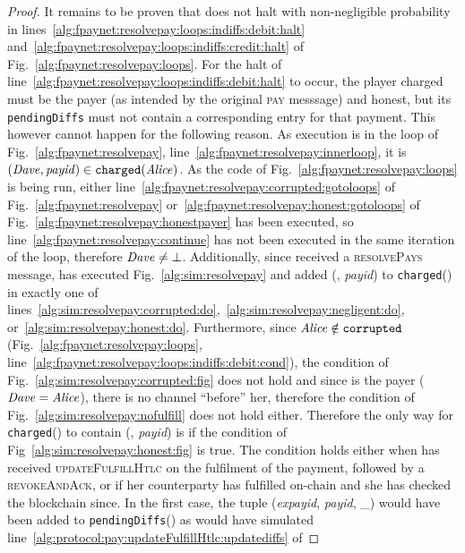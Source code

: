 \begin{proof}
  It remains to be proven that \fpaynet{} does not halt with non-negligible
  probability in lines~\ref{alg:fpaynet:resolvepay:loops:indiffs:debit:halt}
  and~\ref{alg:fpaynet:resolvepay:loops:indiffs:credit:halt} of
  Fig.~\ref{alg:fpaynet:resolvepay:loops}. For the halt of
  line~\ref{alg:fpaynet:resolvepay:loops:indiffs:debit:halt} to occur, the
  player charged must be the payer (as intended by the original \textsc{pay}
  messsage) and honest, but its \texttt{pendingDiffs} must not contain a
  corresponding entry for that payment. This however cannot happen for the
  following reason. As execution is in the loop of
  Fig.~\ref{alg:fpaynet:resolvepay},
  line~\ref{alg:fpaynet:resolvepay:innerloop}, it is $(\mathit{Dave}, \mathit{payid})
  \in \mathtt{charged}(\mathit{Alice})$. As the code of
  Fig.~\ref{alg:fpaynet:resolvepay:loops} is being run, either
  line~\ref{alg:fpaynet:resolvepay:corrupted:gotoloops} of
  Fig.~\ref{alg:fpaynet:resolvepay}
  or~\ref{alg:fpaynet:resolvepay:honest:gotoloops} of
  Fig.~\ref{alg:fpaynet:resolvepay:honestpayer} has been executed, so
  line~\ref{alg:fpaynet:resolvepay:continue} has not been executed in the same
  iteration of the loop, therefore $\mathit{Dave} \neq \bot$. Additionally, since
  \fpaynet{} received a \textsc{resolvePays} message, \simulator{} has executed
  Fig.~\ref{alg:sim:resolvepay} and added (\dave, \textit{payid}) to
  \texttt{charged}(\alice) in exactly one of
  lines~\ref{alg:sim:resolvepay:corrupted:do},~\ref{alg:sim:resolvepay:negligent:do},
  or~\ref{alg:sim:resolvepay:honest:do}. Furthermore, since $\mathit{Alice} \notin
  \mathtt{corrupted}$ (Fig.~\ref{alg:fpaynet:resolvepay:loops},
  line~\ref{alg:fpaynet:resolvepay:loops:indiffs:debit:cond}), the condition of
  Fig.~\ref{alg:sim:resolvepay:corrupted:fig} does not hold and since \alice{}
  is the payer ($\mathit{Dave}{} = \mathit{Alice}$), there is no channel ``before'' her,
  therefore the condition of Fig.~\ref{alg:sim:resolvepay:nofulfill} does not
  hold either. Therefore the only way for \texttt{charged}(\alice) to contain
  (\alice, \textit{payid}) is if the condition of
  Fig~\ref{alg:sim:resolvepay:honest:fig} is true. The condition holds either
  when \alice{} has received \textsc{updateFulfillHtlc} on the fulfilment of the
  payment, followed by a \textsc{revokeAndAck}, or if her counterparty has
  fulfilled on-chain and she has checked the blockchain since. In the first
  case, the tuple (\textit{expayid}, \textit{payid}, \_) would have been added
  to \texttt{pendingDiffs}(\alice) as \simulator{} would have simulated
  line~\ref{alg:protocol:pay:updateFulfillHtlc:updatediffs} of

\end{proof}
